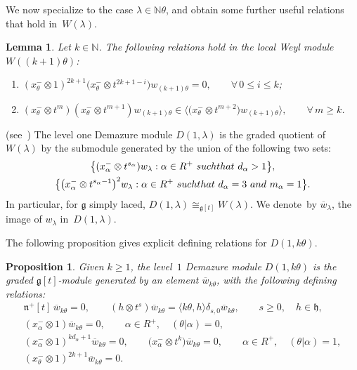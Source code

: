 \documentclass[10pt,a4paper]{amsart}
\newtheorem{lemma}{Lemma}
\newtheorem{proposition}{Proposition}
\begin{document}
We now specialize to the case $\lambda\in \mathbb{N}\theta$, and obtain some further useful relations that hold in~$W(\lambda)$.
\begin{lemma}
\label{g}
Let $k\in\mathbb{N}$.
The following relations hold in the local Weyl module $W((k+1)\theta)$:
\begin{enumerate}\itemsep=0pt
\item[$1)$] $(x^{-}_{\theta}\otimes 1)^{2k+1}\big(x^{-}_{\theta}\otimes t^{2k+1-i}\big)w_{(k+1)\theta}=0,
\qquad
\forall\,
0\leq i \leq k$;
\item[$2)$] $(x^{-}_{\theta}\otimes t^m)(x^{-}_{\theta} \otimes t^{m+1})  w_{(k+1)\theta} \in  \big\langle \big(x^{-}_{\theta}
\otimes t^{m+2}\big) w_{(k+1)\theta} \rangle,
\qquad
\forall\,
m\geq k$.
\end{enumerate}
\end{lemma}

\begin{definition}
\textup{(see~\cite[Corollary 3.5]{CV})} The level one Demazure module $D(1,\lambda)$ is the graded quotient of
$W(\lambda)$ by the submodule generated by the union of the following two sets:
\begin{gather}
\big\{(x^{-}_{\alpha} \otimes t^{s_{\alpha}})  w_{\lambda}: \alpha\in R^{+}~\textup{such that}~d_{\alpha} > 1\big\},
\label{dm1}
\\
\big\{\big(x^{-}_{\alpha} \otimes t^{s_{\alpha}-1}\big)^2  w_{\lambda}: \alpha\in R^{+}~\textup{such that}~d_\alpha =3~\textup{and}~m_\alpha=1\big\}.
\label{dm2}
\end{gather}
In particular, for $\mathfrak{g}$ simply laced, $D(1,\lambda)\cong_{\mathfrak{g}[t]} W(\lambda)$. We denote~by
$\overline{w}_\lambda$, the image of $w_\lambda$ in~$D(1,\lambda)$.
\end{definition}

The following proposition gives explicit def\/ining relations for $D(1,k\theta)$.
\begin{proposition}
\label{WvsD}
Given $k\geq 1$, the level~$1$ Demazure module $D(1,k\theta)$ is the graded $\mathfrak{g}[t]$-module generated by an
element $\overline{w}_{k\theta}$, with the following defining relations:
\begin{gather*}
\mathfrak{n}^{+}[t]\, \overline{w}_{k\theta}=0,
\qquad
(h \otimes t^s) \overline{w}_{k\theta} = \langle k\theta, h\rangle \delta_{s,0} \overline{w}_{k\theta},
\qquad
s\geq0,
\quad
h\in\mathfrak{h},
\\
(x^{-}_{\alpha}\otimes 1) \overline{w}_{k\theta}=0,
\qquad
\alpha\in R^+,
\quad
(\theta|\alpha)=0,
\\
(x^{-}_{\alpha} \otimes 1)^{kd_{\alpha}+1} \overline{w}_{k\theta}=0,
\qquad
\big(x^{-}_{\alpha} \otimes t^k\big) \overline{w}_{k\theta}=0,
\qquad
\alpha\in R^+,
\quad
(\theta|\alpha)=1,
\\
(x^{-}_{\theta} \otimes 1)^{2k+1} \overline{w}_{k\theta}=0.
\end{gather*}
\end{proposition}
\end{document}
